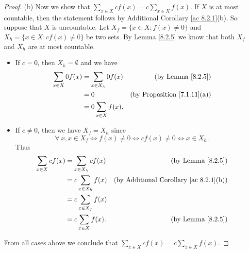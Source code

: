 \begin{proof}{(b)}
    Now we show that \(\sum_{x \in X} cf(x) = c \sum_{x \in X} f(x)\).
    If \(X\) is at most countable, then the statement follows by Additional Corollary \ref{ac 8.2.1}(b).
    So suppose that \(X\) is uncountable.
    Let \(X_f = \{x \in X : f(x) \neq 0\}\) and \(X_h = \{x \in X : cf(x) \neq 0\}\) be two sets.
    By Lemma \ref{8.2.5} we know that both \(X_f\) and \(X_h\) are at most countable.
    \begin{itemize}
        \item If \(c = 0\), then \(X_h = \emptyset\) and we have
              \begin{align*}
                  \sum_{x \in X} 0f(x) & = \sum_{x \in X_h} 0f(x) & \text{(by Lemma \ref{8.2.5})}           \\
                                       & = 0                      & \text{(by Proposition \ref{7.1.11}(a))} \\
                                       & = 0 \sum_{x \in X} f(x).
              \end{align*}
        \item If \(c \neq 0\), then we have \(X_f = X_h\) since
              \[
                  \forall\ x, x \in X_f \iff f(x) \neq 0 \iff cf(x) \neq 0 \iff x \in X_h.
              \]
              Thus
              \begin{align*}
                  \sum_{x \in X} cf(x) & = \sum_{x \in X_h} cf(x)  & \text{(by Lemma \ref{8.2.5})}                      \\
                                       & = c \sum_{x \in X_h} f(x) & \text{(by Additional Corollary \ref{ac 8.2.1}(b))} \\
                                       & = c \sum_{x \in X_f} f(x)                                                      \\
                                       & = c \sum_{x \in X} f(x).  & \text{(by Lemma \ref{8.2.5})}
              \end{align*}
    \end{itemize}
    From all cases above we conclude that \(\sum_{x \in X} cf(x) = c \sum_{x \in X} f(x)\).
\end{proof}

